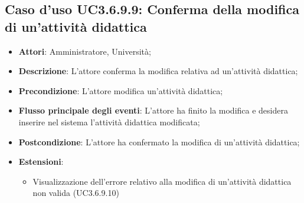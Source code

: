\subsection{Caso d'uso \texorpdfstring{UC3.6.9.9}{UC3.6.9.9}: Conferma della modifica di un'attività didattica}
\begin{itemize}
\item \textbf{Attori}: Amministratore, Università;
\item \textbf{Descrizione}: L'attore conferma la modifica relativa ad un'attività didattica;

\item \textbf{Precondizione}: L'attore modifica un'attività didattica;

\item \textbf{Flusso principale degli eventi}: L'attore ha finito la modifica e desidera inserire nel sistema l'attività didattica modificata;

\item \textbf{Postcondizione}: L'attore ha confermato la modifica di un'attività didattica;

\item \textbf{Estensioni}:
\begin{itemize}
\item Visualizzazione dell'errore relativo alla modifica di un’attività didattica non valida (UC3.6.9.10)
\end{itemize}
\end{itemize}
